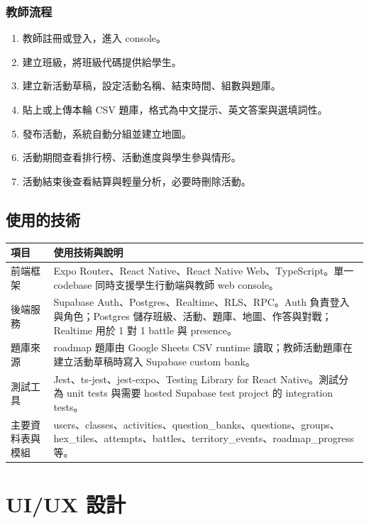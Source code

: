 \documentclass[12pt,a4paper]{article}
\begin{document}
\subsubsection{教師流程}

\begin{enumerate}
  \item 教師註冊或登入，進入 console。
  \item 建立班級，將班級代碼提供給學生。
  \item 建立新活動草稿，設定活動名稱、結束時間、組數與題庫。
  \item 貼上或上傳本輪 CSV 題庫，格式為中文提示、英文答案與選填詞性。
  \item 發布活動，系統自動分組並建立地圖。
  \item 活動期間查看排行榜、活動進度與學生參與情形。
  \item 活動結束後查看結算與輕量分析，必要時刪除活動。
\end{enumerate}

\subsection{使用的技術}

\begin{longtable}{P{4cm}P{10.5cm}}
\toprule
項目 & 使用技術與說明 \\
\midrule
前端框架 & Expo Router、React Native、React Native Web、TypeScript。單一 codebase 同時支援學生行動端與教師 web console。 \\
後端服務 & Supabase Auth、Postgres、Realtime、RLS、RPC。Auth 負責登入與角色；Postgres 儲存班級、活動、題庫、地圖、作答與對戰；Realtime 用於 1 對 1 battle 與 presence。 \\
題庫來源 & roadmap 題庫由 Google Sheets CSV runtime 讀取；教師活動題庫在建立活動草稿時寫入 Supabase custom bank。 \\
測試工具 & Jest、ts-jest、jest-expo、Testing Library for React Native。測試分為 unit tests 與需要 hosted Supabase test project 的 integration tests。 \\
主要資料表與模組 & users、classes、activities、question\_banks、questions、groups、hex\_tiles、attempts、battles、territory\_events、roadmap\_progress 等。 \\
\bottomrule
\end{longtable}

\section{UI/UX 設計}
\end{document}
